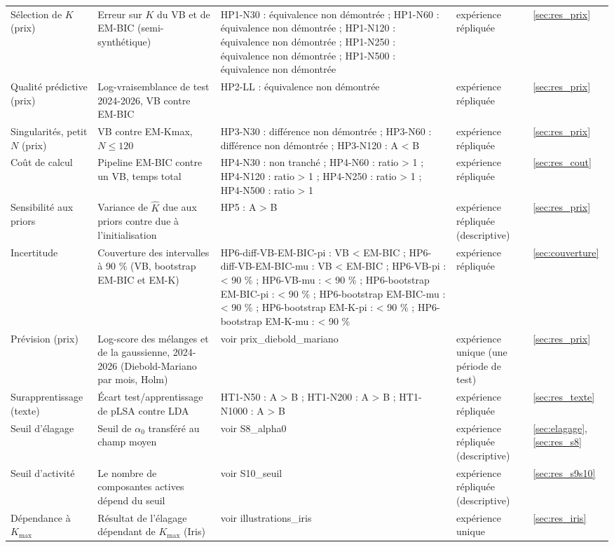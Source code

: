{\begin{longtable}{>{\raggedright\arraybackslash}p{2.40cm}>{\raggedright\arraybackslash}p{4.20cm}>{\raggedright\arraybackslash}p{4.60cm}>{\raggedright\arraybackslash}p{2.20cm}>{\raggedright\arraybackslash}p{1.90cm}}
Sélection de $K$ (prix) & Erreur sur $K$ du VB et de EM-BIC (semi-synthétique) & HP1-N30 : équivalence non démontrée ; HP1-N60 : équivalence non démontrée ; HP1-N120 : équivalence non démontrée ; HP1-N250 : équivalence non démontrée ; HP1-N500 : équivalence non démontrée & expérience répliquée & \ref{sec:res_prix} \\
Qualité prédictive (prix) & Log-vraisemblance de test 2024-2026, VB contre EM-BIC & HP2-LL : équivalence non démontrée & expérience répliquée & \ref{sec:res_prix} \\
Singularités, petit $N$ (prix) & VB contre EM-Kmax, $N\leq120$ & HP3-N30 : différence non démontrée ; HP3-N60 : différence non démontrée ; HP3-N120 : A < B & expérience répliquée & \ref{sec:res_prix} \\
Coût de calcul & Pipeline EM-BIC contre un VB, temps total & HP4-N30 : non tranché ; HP4-N60 : ratio > 1 ; HP4-N120 : ratio > 1 ; HP4-N250 : ratio > 1 ; HP4-N500 : ratio > 1 & expérience répliquée & \ref{sec:res_cout} \\
Sensibilité aux priors & Variance de $\hat K$ due aux priors contre due à l'initialisation & HP5 : A > B & expérience répliquée (descriptive) & \ref{sec:res_prix} \\
Incertitude & Couverture des intervalles à 90 \% (VB, bootstrap EM-BIC et EM-K) & HP6-diff-VB-EM-BIC-pi : VB < EM-BIC ; HP6-diff-VB-EM-BIC-mu : VB < EM-BIC ; HP6-VB-pi : < 90 \% ; HP6-VB-mu : < 90 \% ; HP6-bootstrap EM-BIC-pi : < 90 \% ; HP6-bootstrap EM-BIC-mu : < 90 \% ; HP6-bootstrap EM-K-pi : < 90 \% ; HP6-bootstrap EM-K-mu : < 90 \% & expérience répliquée & \ref{sec:couverture} \\
Prévision (prix) & Log-score des mélanges et de la gaussienne, 2024-2026 (Diebold-Mariano par mois, Holm) & voir prix\_diebold\_mariano & expérience unique (une période de test) & \ref{sec:res_prix} \\
Surapprentissage (texte) & Écart test/apprentissage de pLSA contre LDA & HT1-N50 : A > B ; HT1-N200 : A > B ; HT1-N1000 : A > B & expérience répliquée & \ref{sec:res_texte} \\
Seuil d'élagage & Seuil de $\alpha_0$ transféré au champ moyen & voir S8\_alpha0 & expérience répliquée (descriptive) & \ref{sec:elagage}, \ref{sec:res_s8} \\
Seuil d'activité & Le nombre de composantes actives dépend du seuil & voir S10\_seuil & expérience répliquée (descriptive) & \ref{sec:res_s9s10} \\
Dépendance à $K_{\max}$ & Résultat de l'élagage dépendant de $K_{\max}$ (Iris) & voir illustrations\_iris & expérience unique & \ref{sec:res_iris} \\

\end{longtable}}

